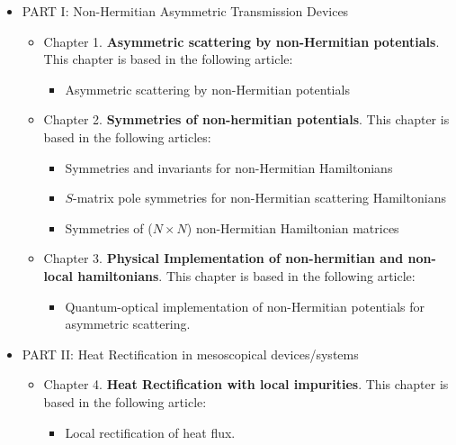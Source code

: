 \begin{itemize}
  \item PART I: Non-Hermitian Asymmetric Transmission Devices

    \begin{itemize}
      \item Chapter 1. \textbf{Asymmetric scattering by non-Hermitian potentials}.
      This chapter is based in the following article:

      \begin{itemize}
        \item Asymmetric scattering by non-Hermitian potentials
      \end{itemize}

      \item Chapter 2. \textbf{Symmetries of non-hermitian potentials}.
      This chapter is based in the following articles:

      \begin{itemize}
        \item Symmetries and invariants for non-Hermitian Hamiltonians
        \item $S$-matrix pole symmetries for non-Hermitian scattering Hamiltonians
        \item Symmetries of ($N \times N$) non-Hermitian Hamiltonian matrices
      \end{itemize}

      \item Chapter 3. \textbf{Physical Implementation of non-hermitian and non-local hamiltonians}.
      This chapter is based in the following article:

      \begin{itemize}
        \item Quantum-optical implementation of non-Hermitian potentials for asymmetric scattering.
      \end{itemize}

    \end{itemize}

  \item PART II: Heat Rectification in mesoscopical devices/systems

    \begin{itemize}
      \item Chapter 4. \textbf{Heat Rectification with local impurities}.
      This chapter is based in the following article:

      \begin{itemize}
        \item Local rectification of heat flux.
      \end{itemize}


\end{itemize}
\end{itemize}
